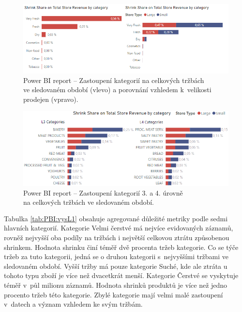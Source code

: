 \begin{figure}[h!]
    \centering
    \captionsetup{justification=centering}
    \includegraphics[width=\textwidth]{obrazky/PBI/vys_L1.png}
    \caption{Power BI report -- Zastoupení kategorií na celkových tržbách  \\ ve sledovaném období (vlevo) a porovnání vzhledem k~velikosti prodejen (vpravo).}
    \label{obr:PBI:vysL1}
\end{figure}

\begin{figure}[h!]
    \centering
    \captionsetup{justification=centering}
    \includegraphics[width=\textwidth]{obrazky/PBI/l3l4.png}
    \caption{Power BI report -- Zastoupení kategorií 3. a 4. úrovně \\na celkových tržbách ve sledovaném období.}
    \label{obr:PBI:vysL34}
\end{figure}


Tabulka \ref*{tab:PBI:vysL1} obsahuje agregované důležité metriky podle sedmi hlavních kategorií. Kategorie Velmi čerstvé má nejvíce evidovaných záznamů, rovněž nejvyšší oba podíly na tržbách i největší celkovou ztrátu způsobenou shrinkem. Hodnota shrinku činí téměř dvě procenta tržeb kategorie. Co se týče tržeb za tuto kategorii, jedná se o druhou kategorii s~nejvyššími tržbami ve sledovaném období. Vyšší tržby má pouze kategorie Suché, kde ale ztráta u tohoto typu zboží je více než dvacetkrát menší. Kategorie Čerstvé se vyskytuje téměř v~půl milionu záznamů. Hodnota shrinků produktů je více než jedno procento tržeb této kategorie. Zbylé kategorie mají velmi malé zastoupení v~datech a význam vzhledem ke svým tržbám.

